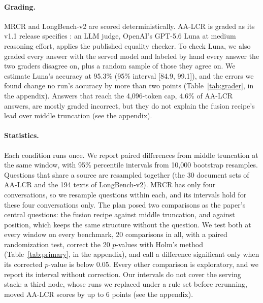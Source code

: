 \documentclass[letterpaper]{article} %
\newcommand{\recipe}{fusion recipe}
\begin{document}
\begin{table}[t]
\centering
\small

\caption{MRCR evidence recall and exact match (EM), 120 questions per row. Recall: the percentage of prompts that keep the target turn complete, and that keep all four needle turns complete. EM given target: EM on the prompts that keep the target turn complete, with their number when below 30; no prompt with an incomplete target turn gets an exact match. On the questions whose target turn the \recipe{} keeps complete, the oracle scores 68.4, 62.4, 58.9 and 61.7 at 32K, 64K, 128K and 262K.}
\label{tab:visibility}
\end{table}

\paragraph{Grading.} MRCR and LongBench-v2 are scored deterministically. AA-LCR is graded as its v1.1 release specifies \cite{artificialanalysis2025aalcr,artificialanalysis2026methodology}: an LLM judge, OpenAI's GPT-5.6 Luna at medium reasoning effort, applies the published equality checker. To check Luna, we also graded every answer with the served model and labeled by hand every answer the two graders disagree on, plus a random sample of those they agree on. We estimate Luna's accuracy at 95.3\% (95\% interval [84.9, 99.1]), and the errors we found change no run's accuracy by more than two points (Table~\ref{tab:grader}, in the appendix). Answers that reach the 4,096-token cap, 4.6\% of AA-LCR answers, are mostly graded incorrect, but they do not explain the \recipe's lead over middle truncation (see the appendix).

\paragraph{Statistics.} Each condition runs once. We report paired differences from middle truncation at the same window, with 95\% percentile intervals from 10,000 bootstrap resamples. Questions that share a source are resampled together (the 30 document sets of AA-LCR and the 194 texts of LongBench-v2). MRCR has only four conversations, so we resample questions within each, and its intervals hold for these four conversations only. The plan posed two comparisons as the paper's central questions: the \recipe{} against middle truncation, and against position, which keeps the same structure without the question. We test both at every window on every benchmark, 20 comparisons in all, with a paired randomization test, correct the 20 $p$-values with Holm's method (Table~\ref{tab:primary}, in the appendix), and call a difference significant only when its corrected $p$-value is below 0.05. Every other comparison is exploratory, and we report its interval without correction. Our intervals do not cover the serving stack: a third node, whose runs we replaced under a rule set before rerunning, moved AA-LCR scores by up to 6 points (see the appendix).
\end{document}
